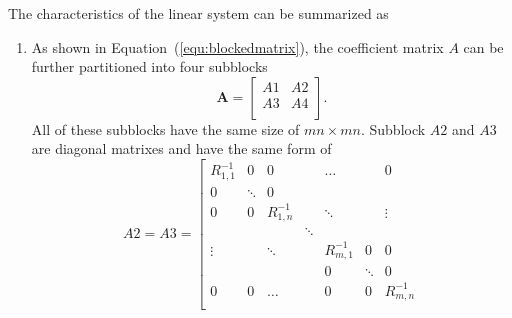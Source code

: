The characteristics of the linear system can be summarized as
\begin{enumerate}
  \item As shown in Equation~(\ref{equ:blockedmatrix}), the
      coefficient matrix $A$ can be further partitioned into four
      subblocks
    \begin{equation}\label{equ:blockedmatrix}
        \mathbf{A} = \left[
        \begin{array}{cc}
            A1 & A2  \\
            A3 & A4  \\
        \end{array} \right].
    \end{equation}
All of these subblocks have the same size of $mn\times mn$. Subblock
$A2$ and $A3$ are diagonal matrixes and have the same form of
\begin{equation}\label{equ:A2A3}
        A2 = A3 = \left[
        \begin{array}{ccccccc}
            R_{1,1}^{-1}    & 0             & 0             & ~         & \ldots    & ~             & 0    \\
            0               & \ddots        & 0             & ~         & ~         & ~             & ~    \\
            0               & 0             & R_{1,n}^{-1}  & ~         & \ddots    & ~             & \vdots    \\
            ~               & ~             & ~             & \ddots    & ~         & ~             & ~    \\
            \vdots          & ~        & \ddots             & ~         & R_{m,1}^{-1}    & 0       & 0   \\
            ~               & ~             & ~             & ~         & 0         & \ddots        & 0    \\
            0               & 0             & \ldots              & ~         & 0    & 0             & R_{m,n}^{-1}    \\


\end{array}
\end{equation}
\end{enumerate}
